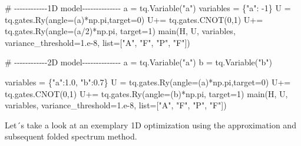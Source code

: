 \documentclass[
  letterpaper,
  DIV=11,
  numbers=noendperiod]{scrartcl}
\newenvironment{Shaded}{\begin{snugshade}}{\end{snugshade}}
\newcommand{\BuiltInTok}[1]{\textcolor[rgb]{0.00,0.23,0.31}{#1}}
\newcommand{\CommentTok}[1]{\textcolor[rgb]{0.37,0.37,0.37}{#1}}
\newcommand{\DecValTok}[1]{\textcolor[rgb]{0.68,0.00,0.00}{#1}}
\newcommand{\FloatTok}[1]{\textcolor[rgb]{0.68,0.00,0.00}{#1}}
\newcommand{\NormalTok}[1]{\textcolor[rgb]{0.00,0.23,0.31}{#1}}
\newcommand{\OperatorTok}[1]{\textcolor[rgb]{0.37,0.37,0.37}{#1}}
\newcommand{\StringTok}[1]{\textcolor[rgb]{0.13,0.47,0.30}{#1}}
\begin{document}
\begin{Shaded}
\begin{Highlighting}[]
\CommentTok{\# {-}{-}{-}{-}{-}{-}{-}{-}{-}{-}{-}{-}1D model{-}{-}{-}{-}{-}{-}{-}{-}{-}{-}{-}{-}{-}{-}}
\NormalTok{a }\OperatorTok{=}\NormalTok{ tq.Variable(}\StringTok{"a"}\NormalTok{)}
\NormalTok{variables }\OperatorTok{=}\NormalTok{ \{}\StringTok{"a"}\NormalTok{: }\OperatorTok{{-}}\DecValTok{1}\NormalTok{\}}
\NormalTok{U }\OperatorTok{=}\NormalTok{ tq.gates.Ry(angle}\OperatorTok{=}\NormalTok{(a)}\OperatorTok{*}\NormalTok{np.pi,target}\OperatorTok{=}\DecValTok{0}\NormalTok{)}
\NormalTok{U}\OperatorTok{+=}\NormalTok{ tq.gates.CNOT(}\DecValTok{0}\NormalTok{,}\DecValTok{1}\NormalTok{)}
\NormalTok{U}\OperatorTok{+=}\NormalTok{ tq.gates.Ry(angle}\OperatorTok{=}\NormalTok{(a}\OperatorTok{/}\DecValTok{2}\NormalTok{)}\OperatorTok{*}\NormalTok{np.pi, target}\OperatorTok{=}\DecValTok{1}\NormalTok{)}
\NormalTok{main(H, U, variables, variance\_threshold}\OperatorTok{=}\FloatTok{1.e{-}8}\NormalTok{, }\BuiltInTok{list}\OperatorTok{=}\NormalTok{[}\StringTok{"A"}\NormalTok{, }\StringTok{"F"}\NormalTok{, }\StringTok{"P"}\NormalTok{, }\StringTok{"F"}\NormalTok{])}

\CommentTok{\# {-}{-}{-}{-}{-}{-}{-}{-}{-}{-}{-}{-}2D model{-}{-}{-}{-}{-}{-}{-}{-}{-}{-}{-}{-}{-}{-}}
\NormalTok{a }\OperatorTok{=}\NormalTok{ tq.Variable(}\StringTok{"a"}\NormalTok{)}
\NormalTok{b }\OperatorTok{=}\NormalTok{ tq.Variable(}\StringTok{"b"}\NormalTok{)}

\NormalTok{variables }\OperatorTok{=}\NormalTok{ \{}\StringTok{"a"}\NormalTok{:}\FloatTok{1.0}\NormalTok{, }\StringTok{"b"}\NormalTok{:}\FloatTok{0.7}\NormalTok{\}}
\NormalTok{U }\OperatorTok{=}\NormalTok{ tq.gates.Ry(angle}\OperatorTok{=}\NormalTok{(a)}\OperatorTok{*}\NormalTok{np.pi,target}\OperatorTok{=}\DecValTok{0}\NormalTok{)}
\NormalTok{U}\OperatorTok{+=}\NormalTok{ tq.gates.CNOT(}\DecValTok{0}\NormalTok{,}\DecValTok{1}\NormalTok{)}
\NormalTok{U}\OperatorTok{+=}\NormalTok{ tq.gates.Ry(angle}\OperatorTok{=}\NormalTok{(b)}\OperatorTok{*}\NormalTok{np.pi, target}\OperatorTok{=}\DecValTok{1}\NormalTok{)}
\NormalTok{main(H, U, variables, variance\_threshold}\OperatorTok{=}\FloatTok{1.e{-}8}\NormalTok{, }\BuiltInTok{list}\OperatorTok{=}\NormalTok{[}\StringTok{"A"}\NormalTok{, }\StringTok{"F"}\NormalTok{, }\StringTok{"P"}\NormalTok{, }\StringTok{"F"}\NormalTok{])}
\end{Highlighting}
\end{Shaded}

Let´s take a look at an exemplary 1D optimization using the
approximation and subsequent folded spectrum method.
\end{document}
